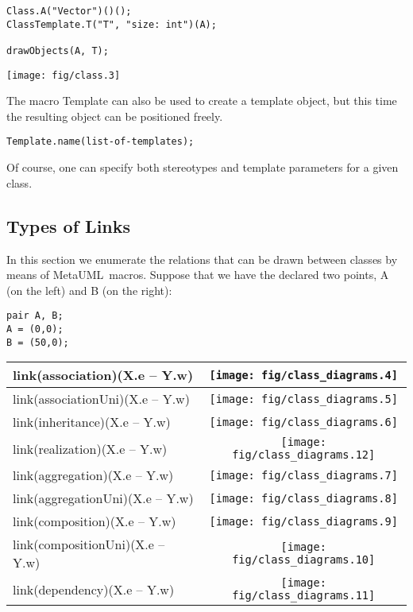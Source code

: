 \documentclass{article}
\newcommand{\code}{\ttfamily}
\newcommand{\metauml}{MetaUML}
\begin{document}
\begin{multicols}{2}
\begin{verbatim}
Class.A("Vector")()();
ClassTemplate.T("T", "size: int")(A);

drawObjects(A, T);
\end{verbatim}
\columnbreak
\hspace{1cm}\texttt{[image: fig/class.3]}
\end{multicols}

The macro {\code Template} can also be used to create a template object, but this time the resulting
object can be positioned freely.

\begin{verbatim}
Template.name(list-of-templates);
\end{verbatim}

Of course, one can specify both stereotypes and template parameters for a given class.

\subsection{Types of Links}

In this section we enumerate the relations that can be drawn between classes by means
of \metauml\ macros. Suppose that we have the declared two points, {\code A} (on the left)
and {\code B} (on the right):

\begin{verbatim}
pair A, B;
A = (0,0);
B = (50,0);
\end{verbatim}

\begin{tabular}{||l|c||}
\hline
{\code link(association)(X.e -- Y.w)} & \texttt{[image: fig/class\_diagrams.4]} \\
\hline
{\code link(associationUni)(X.e -- Y.w)} & \texttt{[image: fig/class\_diagrams.5]}  \\
\hline
{\code link(inheritance)(X.e -- Y.w)} & \texttt{[image: fig/class\_diagrams.6]} \\
\hline
{\code link(realization)(X.e -- Y.w)} & \texttt{[image: fig/class\_diagrams.12]} \\
\hline
{\code link(aggregation)(X.e -- Y.w)} & \texttt{[image: fig/class\_diagrams.7]} \\
\hline
{\code link(aggregationUni)(X.e -- Y.w)} & \texttt{[image: fig/class\_diagrams.8]} \\
\hline
{\code link(composition)(X.e -- Y.w)} & \texttt{[image: fig/class\_diagrams.9]} \\
\hline
{\code link(compositionUni)(X.e -- Y.w)} & \texttt{[image: fig/class\_diagrams.10]} \\
\hline
{\code link(dependency)(X.e -- Y.w)} & \texttt{[image: fig/class\_diagrams.11]} \\
\hline
\end{tabular}
\end{document}

